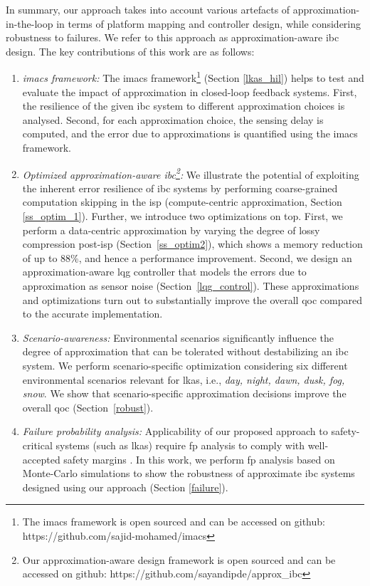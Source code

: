 In summary, our approach takes into account various artefacts of approximation-in-the-loop in terms of platform mapping and controller design, while considering robustness to failures. We refer to this approach as approximation-aware \gls{ibc} design. 
The key contributions of this work are as follows:

\begin{enumerate}
    \item \textit{\Gls{imacs} framework: }
    The \gls{imacs} framework\footnote{The \gls{imacs} framework is open sourced and can be accessed on github: https://github.com/sajid-mohamed/imacs} (Section \ref{lkas_hil}) helps to test and evaluate the impact of approximation in closed-loop feedback systems.
    First, the resilience of the given \gls{ibc} system to different approximation choices is analysed. Second, for each approximation choice, the sensing delay is computed, and the error due to approximations is quantified using the \gls{imacs} framework.
    
    \item \textit{Optimized approximation-aware \gls{ibc}\footnote{Our approximation-aware design framework is open sourced and can be accessed on github: https://github.com/sayandipde/approx\_ibc}: } 
    We illustrate the potential of exploiting the inherent error resilience of \gls{ibc} systems by performing coarse-grained computation skipping in the \gls{isp} (compute-centric approximation, Section \ref{ss_optim_1}). Further, we introduce two optimizations on top. First, we perform a data-centric approximation by varying the degree of lossy compression post-\gls{isp} (Section~\ref{ss_optim2}), which  shows a memory reduction of up to 88\%, and hence a performance improvement. Second, we design an approximation-aware \gls{lqg} controller that models the errors due to approximation as sensor noise (Section~\ref{lqg_control}). These approximations and optimizations turn out to substantially improve the overall \gls{qoc} compared to the accurate implementation. 
    
   \item \textit{Scenario-awareness: }
    Environmental scenarios significantly influence the degree of approximation that can be tolerated without destabilizing an \gls{ibc} system. We perform scenario-specific optimization considering six different environmental scenarios relevant for \gls{lkas}, i.e., \textit{day, night, dawn, dusk, fog, snow}. We show that scenario-specific approximation decisions improve the overall \gls{qoc} (Section~\ref{robust}).
    
    \item \textit{Failure probability analysis: }Applicability of our proposed approach to safety-critical systems (such as \gls{lkas}) require \gls{fp} analysis to comply with well-accepted safety margins \cite{fault_tree}. 
    In this work, we perform \gls{fp} analysis based on Monte-Carlo simulations to show the robustness of approximate \gls{ibc} systems designed using our approach (Section \ref{failure}).
    
\end{enumerate}

